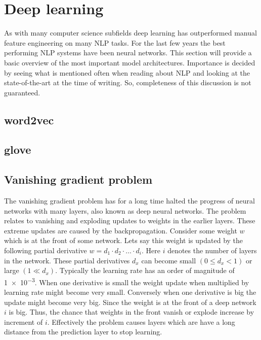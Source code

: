 \section{Deep learning}
\label{sec:deep_learning}

As with many computer science subfields deep learning has outperformed manual feature engineering on many NLP tasks.
For the last few years the best performing NLP systems have been neural networks.
This section will provide a basic overview of the most important model architectures.
Importance is decided by seeing what is mentioned often when reading about NLP and looking at the state-of-the-art at the time of writing.
So, completeness of this discussion is not guaranteed.


\subsection{word2vec}
\label{subsec:word2vec}

\subsection{glove}
\label{subsec:glove}


\subsection{Vanishing gradient problem}
\label{subsec:vanishing_gradient_problem}
The vanishing gradient problem has for a long time halted the progress of neural networks with many layers, also known as deep neural networks.
The problem relates to vanishing and exploding updates to weights in the earlier layers.
These extreme updates are caused by the backpropagation.
Consider some weight $w$ which is at the front of some network.
Lets say this weight is updated by the following partial derivative $w = d_1 \cdot d_2 \cdot \ldots \cdot d_i$.
Here $i$ denotes the number of layers in the network.
These partial derivatives $d_x$ can become small $(0 \leq d_x < 1)$ or large $(1 \ll d_x)$.
Typically the learning rate has an order of magnitude of \num{1e-3}.
When one derivative is small the weight update when multiplied by learning rate might become very small.
Conversely when one derivative is big the update might become very big.
Since the weight is at the front of a deep network $i$ is big.
Thus, the chance that weights in the front vanish or explode increase by increment of $i$.
Effectively the problem causes layers which are have a long distance from the prediction layer to stop learning.

